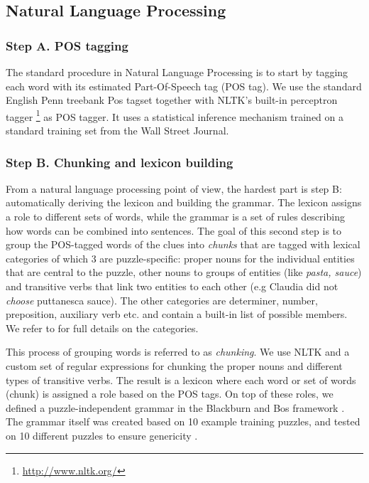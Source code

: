 \subsection{Natural Language Processing}\label{sec:pipeline:nlp}

\subsubsection*{Step A. POS tagging} The standard procedure in Natural Language Processing is to start by tagging each word with its estimated Part-Of-Speech tag (POS tag).
We use the standard English Penn treebank Pos tagset \cite{marcus1993building} together with NLTK's built-in perceptron tagger \footnote{\url{http://www.nltk.org/}} as POS tagger. 
It uses a statistical inference mechanism trained on a standard training set from the Wall Street Journal. 

\subsubsection*{Step B. Chunking and lexicon building} From a natural language processing point of view, the hardest part is step B: automatically deriving the lexicon and building the grammar.
The lexicon assigns a role to different sets of words, while the grammar is a set of rules describing how words can be combined into sentences. 
The goal of this second step is to group the POS-tagged words of the clues into \textit{chunks} that are tagged with lexical categories of which 3 are puzzle-specific: proper nouns for the individual entities that are central to the puzzle, other nouns to groups of entities (like \textit{pasta, sauce}) and transitive verbs that link two entities to each other (e.g Claudia did not \textit{choose} puttanesca sauce). 
The other categories are determiner, number, preposition, auxiliary verb etc.  and contain a built-in list of possible members.  We refer to \cite{msc/Claes17} for full details on the categories.

This process of grouping words is referred to as \textit{chunking}. 
We use NLTK and a custom set of regular expressions for chunking the proper nouns and different types of transitive verbs.
The result is a lexicon where each word or set of words (chunk) is assigned a role based on the POS tags.  
On top of these roles, we defined a puzzle-independent grammar in the Blackburn and Bos framework \cite{Blackburn2005,Blackburn2006}.
The grammar itself was created based on 10 example training puzzles, and tested on 10 different puzzles to ensure genericity \cite{msc/Claes17}. 

